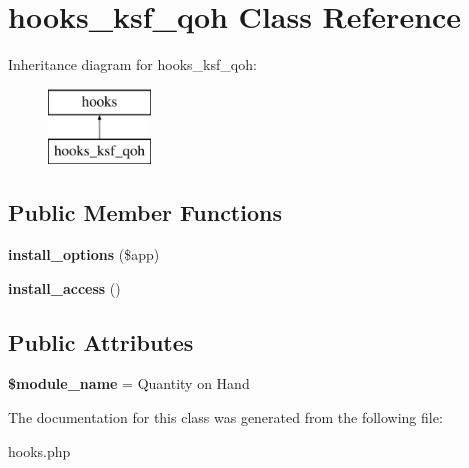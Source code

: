 \hypertarget{classhooks__ksf__qoh}{}\section{hooks\+\_\+ksf\+\_\+qoh Class Reference}
\label{classhooks__ksf__qoh}
Inheritance diagram for hooks\+\_\+ksf\+\_\+qoh\+:\begin{figure}[H]
\begin{center}
\leavevmode
\includegraphics[height=2.000000cm]{d2/d7c/classhooks__ksf__qoh}
\end{center}
\end{figure}
\subsection*{Public Member Functions}
\begin{DoxyCompactItemize}
\item 
\hypertarget{classhooks__ksf__qoh_a9475e2af0e60043a95fc7c93feadc5db}{}\label{classhooks__ksf__qoh_a9475e2af0e60043a95fc7c93feadc5db} 
{\bfseries install\+\_\+options} (\$app)
\item 
\hypertarget{classhooks__ksf__qoh_a16ce6d9c67a774ad4ecf7cecdee5c9b3}{}\label{classhooks__ksf__qoh_a16ce6d9c67a774ad4ecf7cecdee5c9b3} 
{\bfseries install\+\_\+access} ()
\end{DoxyCompactItemize}
\subsection*{Public Attributes}
\begin{DoxyCompactItemize}
\item 
\hypertarget{classhooks__ksf__qoh_aae877d79842f44f3bada169a70f181fa}{}\label{classhooks__ksf__qoh_aae877d79842f44f3bada169a70f181fa} 
{\bfseries \$module\+\_\+name} = \textquotesingle{}Quantity on Hand\textquotesingle{}
\end{DoxyCompactItemize}


The documentation for this class was generated from the following file\+:\begin{DoxyCompactItemize}
\item 
hooks.\+php\end{DoxyCompactItemize}

